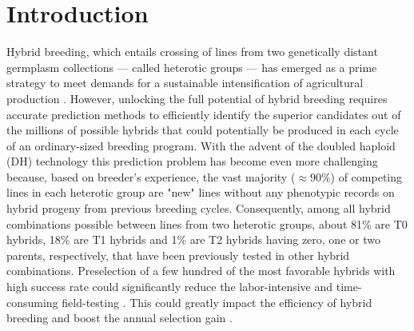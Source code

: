 \documentclass[12pt,titlepage]{article}
\begin{document}
\section{Introduction} 
Hybrid breeding, which entails crossing of lines from two genetically distant
germplasm collections --- called heterotic groups \cite{Melchinger1998} --- 
has emerged as a prime strategy to meet demands for a sustainable
intensification of agricultural production \cite{Duvick2005}.
However, unlocking the full potential of hybrid breeding requires accurate
prediction methods to efficiently identify the superior candidates out of the
millions of possible hybrids that could potentially be produced in each
cycle of an ordinary-sized breeding program.
With the advent of the doubled haploid (DH) technology \cite{Wedzony2009}
this prediction problem has become even more challenging because, based on 
breeder's experience, the vast majority ($\approx 90$\%) of competing lines in 
each heterotic group are "new" lines without any phenotypic records on hybrid
progeny from previous breeding cycles.
Consequently, among all hybrid combinations possible between lines from two
heterotic groups, about 81\% are T0 hybrids, 18\% are T1 hybrids and 1\% are T2
hybrids having zero, one or two parents, respectively, that have been previously
tested in other hybrid combinations.
Preselection of a few hundred of the most favorable hybrids with high success
rate could significantly reduce the labor-intensive and time-consuming
field-testing \cite{Kadam2016,Xu2016}.
This could greatly impact the efficiency of hybrid breeding and boost the
annual selection gain \cite{Longin2015}.
\end{document}

